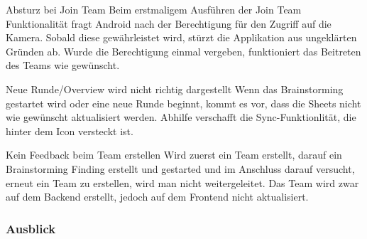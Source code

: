 \begin{basedescript}{
		\desclabelstyle{\multilinelabel}
		\desclabelwidth{4.5cm}
		\setlength{\itemsep}{5ex}}
	\item [Absturz bei Join Team] Beim erstmaligem Ausführen der Join Team Funktionalität fragt Android nach der Berechtigung für den Zugriff auf die Kamera. Sobald diese gewährleistet wird, stürzt die Applikation aus ungeklärten Gründen ab. Wurde die Berechtigung einmal vergeben, funktioniert das Beitreten des Teams wie gewünscht.
	
	\item [Neue Runde/Overview wird nicht richtig dargestellt] 
	Wenn das Brainstorming gestartet wird oder eine neue Runde beginnt, kommt es vor, dass die Sheets nicht wie gewünscht aktualisiert werden. Abhilfe verschafft die Sync-Funktionlität, die hinter dem Icon versteckt ist.
	
	\item [Kein Feedback beim Team erstellen] 
	Wird zuerst ein Team erstellt, darauf ein Brainstorming Finding erstellt und gestarted und im Anschluss darauf versucht, erneut ein Team zu erstellen, wird man nicht weitergeleitet. Das Team wird zwar auf dem Backend erstellt, jedoch auf dem Frontend nicht aktualisiert.
\end{basedescript}


\subsubsection{Ausblick}
\label{subsub:Ausblick}




